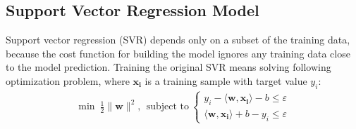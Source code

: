 \subsection{Support Vector Regression Model}
Support vector regression (SVR) depends only on a subset of the training data, 
because the cost function for building the model ignores any training data close to the model prediction. 
Training the original SVR means solving following optimization problem, where ${\displaystyle \mathbf{x_{i}}}$ is a training sample with target value ${\displaystyle y_{i}}$:
\begin{align*}
\min ~ {\displaystyle {\frac {1}{2}}\|\mathbf{w}\|^{2}}, ~~
\text{subject to} ~{\displaystyle {\begin{cases}y_{i}-\langle \mathbf{w},\mathbf{x_{i}}\rangle -b\leq \varepsilon \\\langle \mathbf{w},\mathbf{x_{i}}\rangle +b-y_{i}\leq \varepsilon \end{cases}}}
\end{align*}



